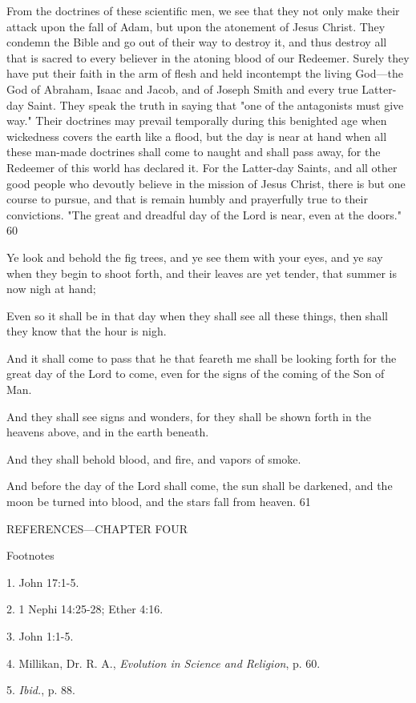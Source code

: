 From the doctrines of these scientific men, we see that they not only make their attack upon
the fall of Adam, but upon the atonement of Jesus Christ. They condemn the Bible and go out
of their way to destroy it, and thus destroy all that is sacred to every believer in the atoning
blood of our Redeemer. Surely they have put their faith in the arm of flesh and held incontempt the living God—the God of Abraham, Isaac and Jacob, and of Joseph Smith and
every true Latter-day Saint. They speak the truth in saying that "one of the antagonists must
give way." Their doctrines may prevail temporally during this benighted age when
wickedness covers the earth like a flood, but the day is near at hand when all these man-made
doctrines shall come to naught and shall pass away, for the Redeemer of this world has
declared it. For the Latter-day Saints, and all other good people who devoutly believe in the
mission of Jesus Christ, there is but one course to pursue, and that is remain humbly and
prayerfully true to their convictions. "The great and dreadful day of the Lord is near, even at
the doors." 60

Ye look and behold the fig trees, and ye see them with your eyes, and ye say when they begin
to shoot forth, and their leaves are yet tender, that summer is now nigh at hand;

Even so it shall be in that day when they shall see all these things, then shall they know that
the hour is nigh.

And it shall come to pass that he that feareth me shall be looking forth for the great day of the
Lord to come, even for the signs of the coming of the Son of Man.

And they shall see signs and wonders, for they shall be shown forth in the heavens above,
and in the earth beneath.

And they shall behold blood, and fire, and vapors of smoke.

And before the day of the Lord shall come, the sun shall be darkened, and the moon be
turned into blood, and the stars fall from heaven. 61

\newpage
REFERENCES—CHAPTER FOUR

Footnotes

1. John 17:1-5.

2. 1 Nephi 14:25-28; Ether 4:16.

3. John 1:1-5.

4. Millikan, Dr. R. A., \textit{Evolution in Science and Religion}, p. 60.

5. \textit{Ibid.}, p. 88.

